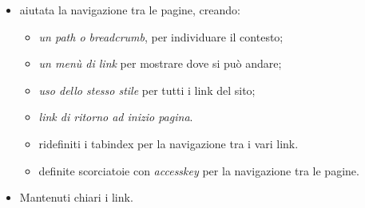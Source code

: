 {{		\begin{itemize}\itemsep1pt
			\item aiutata la navigazione tra le pagine, creando:
			\begin{itemize}\itemsep1pt
				\item \textit{un path o breadcrumb}, per individuare il contesto;
				\item \textit{un menù di link} per mostrare dove si può andare;
				\item \textit{uso dello stesso stile} per tutti i link del sito;
				\item \textit{link di ritorno ad inizio pagina}.
				\item ridefiniti i tabindex per la navigazione tra i vari link.
				\item definite scorciatoie con \textit{accesskey} per la navigazione tra le pagine.
			\end{itemize}
			\item Mantenuti chiari i link.
		\end{itemize}
	}
}
